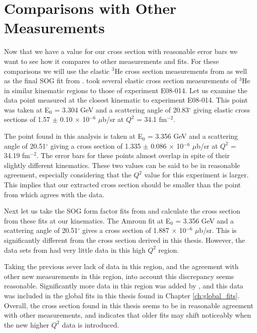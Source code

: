 \section{Comparisons with Other Measurements}
\label{sec:comparisons}

Now that we have a value for our cross section with reasonable error bars we want to see how it compares to other measurements and fits. For these comparisons we will use the elastic $^3$He cross section measurements from \cite{Article:Alex} as well as the final SOG fit from \cite{Article:Amroun}. \cite{Article:Alex} took several elastic cross section measurements of $^3$He in similar kinematic regions to those of experiment E08-014. Let us examine the data point measured at the closest kinematic to experiment E08-014. This point was taken at E$_0$ = 3.304 GeV and a scattering angle of 20.83$^{\circ}$ giving elastic cross sections of 1.57 $\pm$ 0.10 $\times$ 10$^{-6}$ $\mu$b/sr at $Q^2$ = 34.1 fm$^{-2}$. 

The point found in this analysis is taken at E$_0$ = 3.356 GeV and a scattering angle of 20.51$^{\circ}$ giving a cross section of 1.335 $\pm$ 0.086 $\times$ 10$^{-6}$ $\mu$b/sr at $Q^2$ = 34.19 fm$^{-2}$. The error bars for these points almost overlap in spite of their slightly different kinematics. These two values can be said to be in reasonable agreement, especially considering that the $Q^2$ value for this experiment is larger. This implies that our extracted cross section should be smaller than the point from \cite{Article:Alex} which agrees with the data.

Next let us take the SOG form factor fits from \cite{Article:Amroun} and calculate the cross section from these fits at our kinematics. The Amroun fit at E$_0$ = 3.356 GeV and a scattering angle of 20.51$^{\circ}$ gives a cross section of  1.887 $\times$ 10$^{-6}$ $\mu$b/sr. This is significantly different from the cross section derived in this thesis. However, the data sets from \cite{Article:Amroun} had very little data in this high $Q^2$ region. 

Taking the previous sever lack of data in this region, and the agreement with other new measurements in this region, into account this discrepancy seems reasonable. Significantly more data in this region was added by \cite{Article:Alex}, and this data was included in the global fits in this thesis found in Chapter \ref{ch:global_fits}. Overall, the cross section found in this thesis seems to be in reasonable agreement with other measurements, and indicates that older fits may shift noticeably when the new higher $Q^2$ data is introduced.